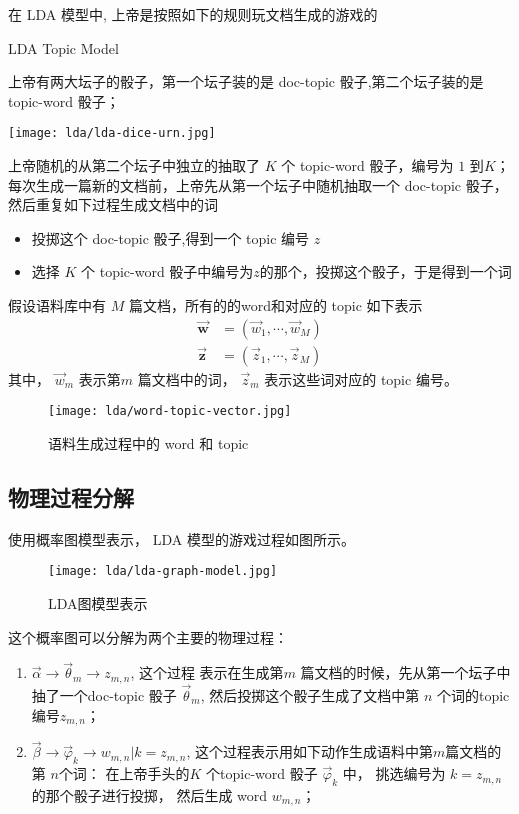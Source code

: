 在 LDA 模型中, 上帝是按照如下的规则玩文档生成的游戏的
\begin{algorithm}[H]
\caption{LDA Topic Model }
\begin{algorithmic}[1]
\STATE 上帝有两大坛子的骰子，第一个坛子装的是 doc-topic 骰子,第二个坛子装的是 topic-word 骰子；
\begin{center}
\texttt{[image: lda/lda-dice-urn.jpg]}
\end{center}

\STATE 上帝随机的从第二个坛子中独立的抽取了 $K$ 个 topic-word 骰子，编号为 $1$ 到$K$；
\STATE 每次生成一篇新的文档前，上帝先从第一个坛子中随机抽取一个 doc-topic 骰子，然后重复如下过程生成文档中的词
\begin{itemize}
\item 投掷这个 doc-topic 骰子,得到一个 topic 编号 $z$
\item 选择 $K$ 个 topic-word 骰子中编号为$z$的那个，投掷这个骰子，于是得到一个词
\end{itemize}
\end{algorithmic}
\end{algorithm}

假设语料库中有 $M$ 篇文档，所有的的word和对应的 topic 如下表示
\begin{align*}
\vec{\mathbf{w}} & = (\vec{w}_1, \cdots, \vec{w}_M) \\
\vec{\mathbf{z}} & = (\vec{z}_1, \cdots, \vec{z}_M)
\end{align*}
其中， $\vec{w}_m$ 表示第$m$ 篇文档中的词， $\vec{z}_m$ 表示这些词对应的 topic 编号。
\begin{figure}[H]
\centering
\texttt{[image: lda/word-topic-vector.jpg]}
\caption{语料生成过程中的 word 和 topic}
\end{figure}

\subsection{物理过程分解}
使用概率图模型表示， LDA 模型的游戏过程如图所示。
\begin{figure}[H]
\centering
\texttt{[image: lda/lda-graph-model.jpg]}
\caption{LDA图模型表示}
\end{figure}


这个概率图可以分解为两个主要的物理过程：
\begin{enumerate}
\item $\vec{\alpha}\rightarrow \vec{\theta}_m \rightarrow  z_{m,n}$, 这个过程
表示在生成第$m$ 篇文档的时候，先从第一个坛子中抽了一个doc-topic 骰子 $\vec{\theta}_m$,
然后投掷这个骰子生成了文档中第 $n$ 个词的topic编号$z_{m,n}$；

\item $\vec{\beta} \rightarrow \vec{\varphi}_k \rightarrow w_{m,n} | k=z_{m,n}$,
这个过程表示用如下动作生成语料中第$m$篇文档的第 $n$个词：
在上帝手头的$K$ 个topic-word 骰子 $\vec{\varphi}_k$ 中，
挑选编号为 $k=z_{m,n}$的那个骰子进行投掷，
然后生成 word $w_{m,n}$；
\end{enumerate}

